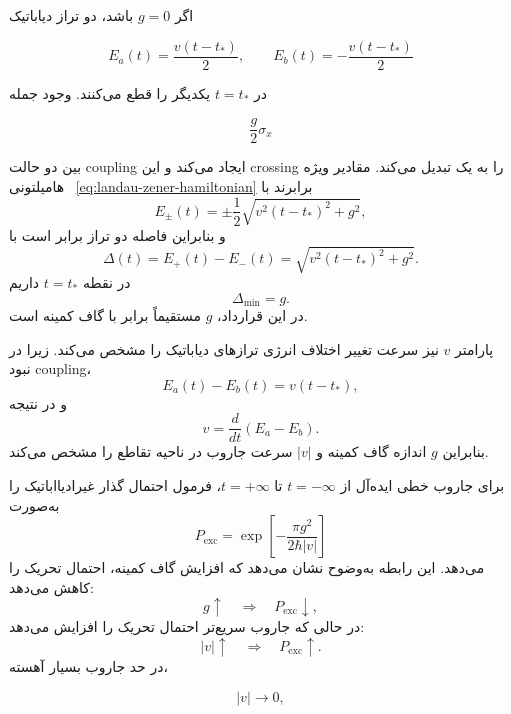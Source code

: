 اگر $g=0$ باشد، دو تراز دیاباتیک

$$
E_a(t)=\frac{v(t-t_*)}{2},
\qquad
E_b(t)=-\frac{v(t-t_*)}{2}
$$

در $t=t_*$ یکدیگر را قطع می‌کنند. وجود جمله

$$
\frac{g}{2}\sigma_x
$$

بین دو حالت coupling ایجاد می‌کند و این crossing را به یک
 تبدیل می‌کند. مقادیر ویژه هامیلتونی
~\eqref{eq:landau-zener-hamiltonian} برابرند با
\begin{equation}
	E_\pm(t)=	
	\pm\frac{1}{2}
	\sqrt{v^2(t-t_*)^2+g^2},
\end{equation}
و بنابراین فاصله دو تراز برابر است با
\begin{equation}
	\Delta(t)
	=
	E_+(t)-E_-(t)
	=
	\sqrt{v^2(t-t_*)^2+g^2}.
	\label{eq:landau-zener-gap}
\end{equation}
در نقطه $t=t_*$ داریم
\begin{equation}
	\Delta_{\min}=g.
\end{equation}
در این قرارداد، $g$ مستقیماً برابر با گاف کمینه است.

پارامتر $v$ نیز سرعت تغییر اختلاف انرژی ترازهای دیاباتیک را
مشخص می‌کند. زیرا در نبود coupling،
\begin{equation}
	E_a(t)-E_b(t)=v(t-t_*),
\end{equation}
و در نتیجه
\begin{equation}
	v=
	\frac{d}{dt}
	\left(E_a-E_b\right).
\end{equation}
بنابراین $g$ اندازه گاف کمینه و $|v|$ سرعت جاروب در ناحیه
تقاطع را مشخص می‌کند.

برای جاروب خطی ایده‌آل از $t=-\infty$ تا $t=+\infty$، فرمول
 احتمال گذار غیرادیااباتیک را به‌صورت
\begin{equation}
	P_{\mathrm{exc}}=	
	\exp\left[
	-\frac{\pi g^2}
	{2\hbar|v|}
	\right]
	\label{eq:landau-zener-probability}
\end{equation}
می‌دهد. این رابطه به‌وضوح نشان می‌دهد که افزایش گاف کمینه،
احتمال تحریک را کاهش می‌دهد:
\begin{equation}
	g\uparrow
	\quad\Longrightarrow\quad
	P_{\mathrm{exc}}\downarrow,
\end{equation}
در حالی که جاروب سریع‌تر احتمال تحریک را افزایش می‌دهد:
\begin{equation}
	|v|\uparrow
	\quad\Longrightarrow\quad
	P_{\mathrm{exc}}\uparrow.
\end{equation}
در حد جاروب بسیار آهسته،

$$
|v|\rightarrow0,
$$

